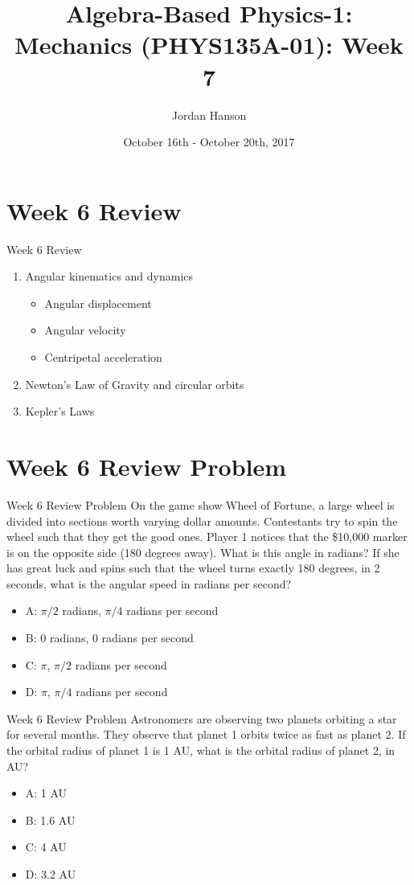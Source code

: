 \documentclass{beamer}
\title{Algebra-Based Physics-1: Mechanics (PHYS135A-01): Week 7}
\date{October 16th - October 20th, 2017}
\author{Jordan Hanson}
\institute{Whittier College Department of Physics and Astronomy}
\begin{document}
\maketitle

\section{Week 6 Review}

\begin{frame}{Week 6 Review}
\begin{enumerate}
\item \alert{Angular} kinematics and dynamics
\begin{itemize}
\item Angular displacement
\item Angular velocity
\item Centripetal acceleration
\end{itemize}
\item \alert{Newton's Law of Gravity} and circular orbits
\item Kepler's Laws
\end{enumerate}
\end{frame}

\section{Week 6 Review Problem}

\begin{frame}{Week 6 Review Problem}
On the game show Wheel of Fortune, a large wheel is divided into sections worth varying dollar amounts.  Contestants try to spin the wheel such that they get the good ones.  Player 1 notices that the \$10,000 marker is on the opposite side (180 degrees away).  What is this angle in radians?  If she has great luck and spins such that the wheel turns exactly 180 degrees, in 2 seconds, what is the angular speed in radians per second?
\begin{itemize}
\item A: $\pi/2$ radians, $\pi/4$ radians per second
\item B: $0$ radians, $0$ radians per second
\item C: $\pi$, $\pi/2$ radians per second
\item D: $\pi$, $\pi/4$ radians per second
\end{itemize}
\end{frame}

\begin{frame}{Week 6 Review Problem}
Astronomers are observing two planets orbiting a star for several months.  They observe that planet 1 orbits twice as fast as planet 2.  If the orbital radius of planet 1 is 1 AU, what is the orbital radius of planet 2, in AU?
\begin{itemize}
\item A: 1 AU
\item B: 1.6 AU
\item C: 4 AU
\item D: 3.2 AU
\end{itemize}
\end{frame}
\end{document}
